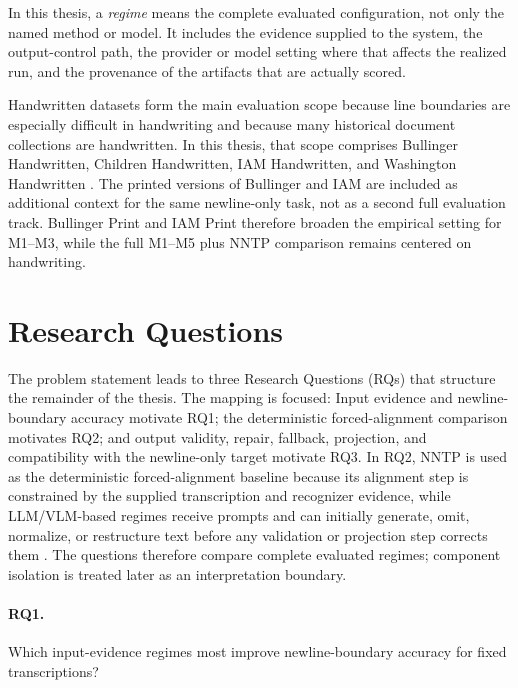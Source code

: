 In this thesis, a \emph{regime} means the complete evaluated configuration, not only the named method or model. It includes the evidence supplied to the system, the output-control path, the provider or model setting where that affects the realized run, and the provenance of the artifacts that are actually scored.

Handwritten datasets form the main evaluation scope because line boundaries are especially difficult in handwriting and because many historical document collections are handwritten. In this thesis, that scope comprises Bullinger Handwritten, Children Handwritten, IAM Handwritten, and Washington Handwritten . The printed versions of Bullinger and IAM are included as additional context for the same newline-only task, not as a second full evaluation track. Bullinger Print and IAM Print therefore broaden the empirical setting for M1--M3, while the full M1--M5 plus NNTP comparison remains centered on handwriting.

\section{Research Questions}
\label{sec:intro_research_questions}

The problem statement leads to three Research Questions (RQs) that structure the remainder of the thesis. The mapping is focused: Input evidence and newline-boundary accuracy motivate RQ1; the deterministic forced-alignment comparison motivates RQ2; and output validity, repair, fallback, projection, and compatibility with the newline-only target motivate RQ3. In RQ2, NNTP is used as the deterministic forced-alignment baseline because its alignment step is constrained by the supplied transcription and recognizer evidence, while LLM/VLM-based regimes receive prompts and can initially generate, omit, normalize, or restructure text before any validation or projection step corrects them . The questions therefore compare complete evaluated regimes; component isolation is treated later as an interpretation boundary.

\paragraph{RQ1.} Which input-evidence regimes most improve newline-boundary accuracy for fixed transcriptions?

